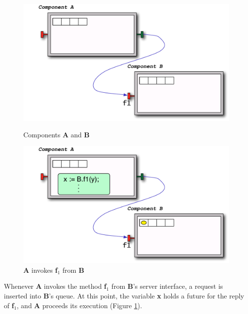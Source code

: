 	\begin{figure}[H]
	\begin{minipage}[b]{0.5\linewidth} 
	\includegraphics[width=\textwidth]{figures/chapter2/asynch1.pdf}
	\caption{Components \textbf{A} and \textbf{B}}
	\label{fig:asynch1}
	\end{minipage}
	\begin{minipage}[b]{0.5\linewidth} 
	\includegraphics[width=\textwidth]{figures/chapter2/asynch2.pdf}
	\caption{\textbf{A} invokes \textbf{f$_1$} from \textbf{B}}
	\label{fig:asynch2}
	\end{minipage}
	\end{figure}	 
		
	\noindent Whenever \textbf{A} invokes the method \textbf{f$_1$} from \textbf{B}'s
	server interface, a request is inserted into \textbf{B}'s queue.
	At this point, the variable \textbf{x} holds a future for the reply of \textbf{f$_1$},
	and \textbf{A} proceeds its execution (Figure \ref{fig:asynch2}). 
		
	
	
